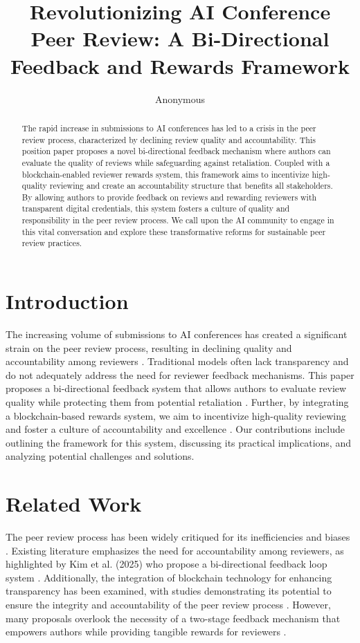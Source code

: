 \documentclass{article} %
\title{
Revolutionizing AI Conference Peer Review: A Bi-Directional Feedback and Rewards Framework
}
\author{Anonymous}
\theoremstyle{plain}
\theoremstyle{definition}
\theoremstyle{remark}
\begin{document}
\maketitle

\begin{abstract}
The rapid increase in submissions to AI conferences has led to a crisis in the peer review process, characterized by declining review quality and accountability. This position paper proposes a novel bi-directional feedback mechanism where authors can evaluate the quality of reviews while safeguarding against retaliation. Coupled with a blockchain-enabled reviewer rewards system, this framework aims to incentivize high-quality reviewing and create an accountability structure that benefits all stakeholders. By allowing authors to provide feedback on reviews and rewarding reviewers with transparent digital credentials, this system fosters a culture of quality and responsibility in the peer review process. We call upon the AI community to engage in this vital conversation and explore these transformative reforms for sustainable peer review practices.
\end{abstract}

\section{Introduction}
The increasing volume of submissions to AI conferences has created a significant strain on the peer review process, resulting in declining quality and accountability among reviewers \cite{kim2025positionta}. Traditional models often lack transparency and do not adequately address the need for reviewer feedback mechanisms. This paper proposes a bi-directional feedback system that allows authors to evaluate review quality while protecting them from potential retaliation \cite{sahakyan2025disparitiesip}. Further, by integrating a blockchain-based rewards system, we aim to incentivize high-quality reviewing and foster a culture of accountability and excellence \cite{barbuta2023adp}. Our contributions include outlining the framework for this system, discussing its practical implications, and analyzing potential challenges and solutions.

\section{Related Work}
The peer review process has been widely critiqued for its inefficiencies and biases \cite{king2024reimaginingpr}. Existing literature emphasizes the need for accountability among reviewers, as highlighted by Kim et al. (2025) who propose a bi-directional feedback loop system \cite{kim2025positionta}. Additionally, the integration of blockchain technology for enhancing transparency has been examined, with studies demonstrating its potential to ensure the integrity and accountability of the peer review process \cite{piantari2024blockchainfm}. However, many proposals overlook the necessity of a two-stage feedback mechanism that empowers authors while providing tangible rewards for reviewers \cite{hijikata2025influenceod}.
\end{document}
